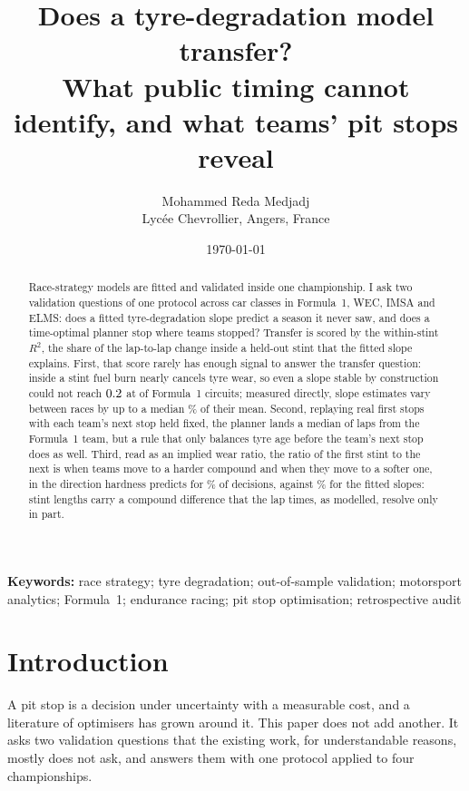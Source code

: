 \documentclass[11pt,a4paper]{article}
\title{Does a tyre-degradation model transfer?\\
\large What public timing cannot identify, and what teams' pit stops reveal}
\author{Mohammed Reda Medjadj \\ Lyc\'ee Chevrollier, Angers, France}
\date{\today}
\begin{document}
\maketitle
\linenumbers

\begin{abstract}
Race-strategy models are fitted and validated inside one championship. I ask
two validation questions of one protocol across \NClasses{} car classes in
Formula~1, WEC, IMSA and ELMS: does a fitted tyre-degradation slope predict a
season it never saw, and does a time-optimal planner stop where teams stopped?
Transfer is scored by the within-stint $R^2$, the share of the lap-to-lap change
inside a held-out stint that the fitted slope explains. First, that score
rarely has enough signal to answer the transfer question: inside a stint
fuel burn nearly cancels tyre wear, so even a slope stable by construction
could not reach $0.2{}$ at \NCeilingBelowThreshold{} of
\NCeilingCircuits{} Formula~1 circuits; measured directly, slope estimates vary
between races by up to a median \TauPubShareReml{}\% of their mean. Second, replaying
\NCommitTotal{} real first stops with each team's next stop held fixed, the
planner lands a median of \CommitAllAfter{} laps \CommitAllCi{} from the Formula~1 team,
but a rule that only balances tyre age
before the team's next stop does as well. Third, read as an implied wear
ratio, the ratio of the first
stint to the next is \ImpliedHarder{}
\ImpliedHarderCi{} when teams move to a harder compound and \ImpliedSofter{}
\ImpliedSofterCi{} when they move to a softer one, in the direction
hardness predicts for \ImpliedExpectedSide{}\% of decisions, against
\ImpliedFittedExpectedSide{}\% for the fitted slopes: stint lengths carry a
compound difference that the lap times, as modelled, resolve only in part.
\end{abstract}

\vspace{0.6em}
\noindent\textbf{Keywords:} race strategy; tyre degradation; out-of-sample
validation; motorsport analytics; Formula~1; endurance racing; pit stop
optimisation; retrospective audit

\doublespacing

\section{Introduction}

A pit stop is a decision under uncertainty with a measurable cost, and a
literature of optimisers has grown around it. This paper does not add another.
It asks two validation questions that the existing work, for understandable
reasons, mostly does not ask, and answers them with one protocol applied to four
championships.
\end{document}
